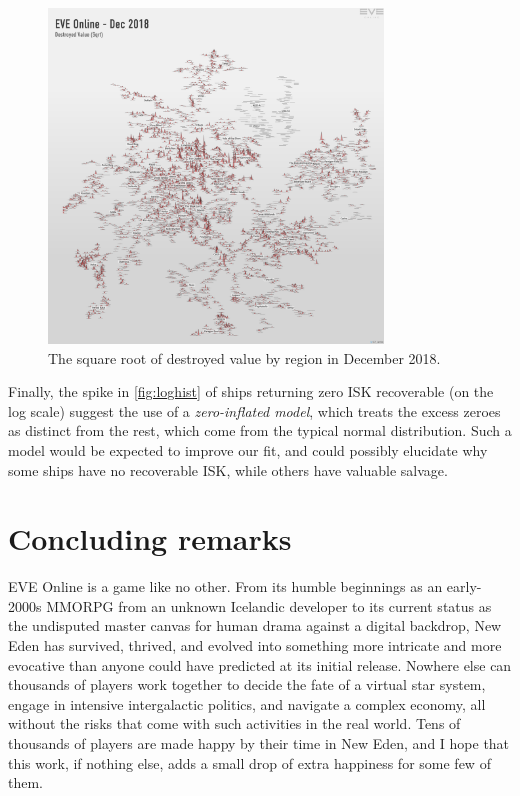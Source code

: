\documentclass[letterpaper,12pt,article]{memoir}
\begin{document}
\begin{figure}[ht]
    \centering
    \includegraphics[width=3.5in]{destroyed_value_(sqrt).png}
    \caption{The square root of destroyed value by region in December 2018.
    \cite{MERdec2018}}
    \label{fig:destroyed}
\end{figure}

Finally, the spike in \cref{fig:loghist} of ships returning zero ISK recoverable (on
the log scale) suggest the use of a \textit{zero-inflated model}, which treats the
excess zeroes as distinct from the rest, which come from the typical normal
distribution. Such a model would be expected to improve our fit, and could possibly
elucidate why some ships have no recoverable ISK, while others have valuable salvage.

\section{Concluding remarks}

EVE Online is a game like no other. From its humble beginnings as an early-2000s
MMORPG from an unknown Icelandic developer to its current status as the undisputed
master canvas for human drama against a digital backdrop, New Eden has survived,
thrived, and evolved into something more intricate and more evocative than anyone
could have predicted at its initial release. Nowhere else can thousands of players
work together to decide the fate of a virtual star system, engage in intensive 
intergalactic politics, and navigate a complex economy, all without the risks that
come with such activities in the real world. Tens of thousands of players are made
happy by their time in New Eden, and I hope that this work, if nothing else, adds
a small drop of extra happiness for some few of them.
\end{document}
